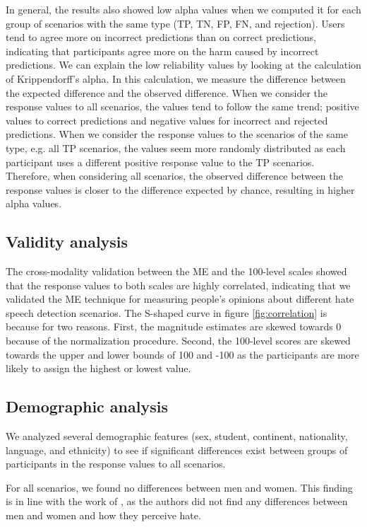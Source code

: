 %
In general, the results also showed low alpha values when we computed it for each group of scenarios with the same type (TP, TN, FP, FN, and rejection).
%
Users tend to agree more on incorrect predictions than on correct predictions, indicating that participants agree more on the harm caused by incorrect predictions.
%
We can explain the low reliability values by looking at the calculation of Krippendorff's alpha.
%
In this calculation, we measure the difference between the expected difference and the observed difference.
%
When we consider the response values to all scenarios, the values tend to follow the same trend; positive values to correct predictions and negative values for incorrect and rejected predictions.
%
When we consider the response values to the scenarios of the same type, e.g. all TP scenarios, the values seem more randomly distributed as each participant uses a different positive response value to the TP scenarios.
%
Therefore, when considering all scenarios, the observed difference between the response values is closer to the difference expected by chance, resulting in higher alpha values.
%

%
\subsection{Validity analysis}
\label{sec:discussion-validity}
The cross-modality validation between the ME and the 100-level scales showed that the response values to both scales are highly correlated, indicating that we validated the ME technique for measuring people's opinions about different hate speech detection scenarios.
%
The S-shaped curve in figure \ref{fig:correlation} is because for two reasons.
%
First, the magnitude estimates are skewed towards 0 because of the normalization procedure.
%
Second, the 100-level scores are skewed towards the upper and lower bounds of 100 and -100 as the participants are more likely to assign the highest or lowest value.

\subsection{Demographic analysis}
\label{sec:discussion-demographic}
We analyzed several demographic features (sex, student, continent, nationality, language, and ethnicity) to see if significant differences exist between groups of participants in the response values to all scenarios.
%

%
For all scenarios, we found no differences between men and women.
%
This finding is in line with the work of \citet{gold2018women}, as the authors did not find any differences between men and women and how they perceive hate.
%


